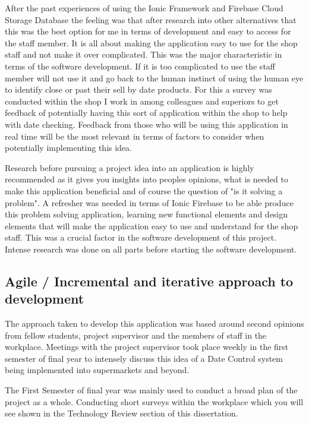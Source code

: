 After the past experiences of using the Ionic Framework and Firebase Cloud Storage Database the feeling was that after research into other alternatives that this was the best option for me in terms of development and easy to access for the staff member. It is all about making the application easy to use for the shop staff and not make it over complicated. This was the major characteristic in terms of the software development. If it is too complicated to use the staff member will not use it and go back to the human instinct of using the human eye to identify close or past their sell by date products. For this a survey was conducted within the shop I work in among colleagues and superiors to get feedback of potentially having this sort of application within the shop to help with date checking. Feedback from those who will be using this application in real time will be the most relevant in terms of factors to consider when potentially implementing this idea. 
\newline

Research before pursuing a project idea into an application is highly recommended as it gives you insights into peoples opinions, what is needed to make this application beneficial and of course the question of "is it solving a problem". A refresher was needed in terms of Ionic Firebase to be able produce this problem solving application, learning new functional elements and design elements that will make the application easy to use and understand for the shop staff. This was a crucial factor in the software development of this project. Intense research was done on all parts before starting the software development.

\subsection{Agile / Incremental and iterative approach to development}
The approach taken to develop this application was based around second opinions from fellow students, project supervisor and the members of staff in the workplace. Meetings with the project supervisor took place weekly in the first semester of final year to intensely discuss this idea of a Date Control system being implemented into supermarkets and beyond. \newline

The First Semester of final year was mainly used to conduct a broad plan of the project as a whole. Conducting short surveys within the workplace which you will see shown in the Technology Review section of this dissertation. 
\newline

